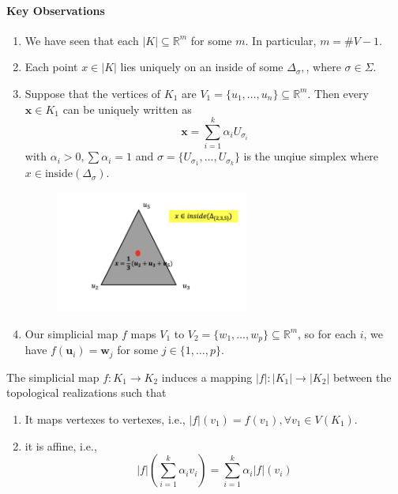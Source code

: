 \paragraph{Key Observations}
\begin{enumerate}
\item
We have seen that each $|K|\subseteq \mathbb{R}^m$ for some $m$.
In particular, $m=\# V-1$.
\item
Each point $x\in|K|$ lies uniquely on an inside of some $\Delta_\sigma,$, where $\sigma\in\Sigma$.
\item
Suppose that the vertices of $K_1$ are $V_1=\{u_1,\dots,u_n\}\subseteq\mathbb{R}^m$.
Then every $\bm x\in K_1$ can be uniquely written as
\[
\bm x=\sum_{i=1}^k\alpha_iU_{\sigma_i}
\]
with $\alpha_i>0,\sum\alpha_i=1$
and $\sigma=\{U_{\sigma_1},\dots,U_{\sigma_k}\}$ is the unqiue simplex where $x\in\text{inside}(\Delta_\sigma)$.

\begin{figure}[H]
\centering
\includegraphics[width=0.6\textwidth]{week9/p_6}
\end{figure}
\item
Our simplicial map $f$ maps $V_1$ to $V_2=\{ w_1,\dots, w_p\}\subseteq\mathbb{R}^m$, so for each $i$, we have $f(\bm u_i) = \bm w_j$ for some $j\in\{1,\dots,p\}$.
\end{enumerate}

\begin{definition}
The simplicial map $f:K_1\to K_2$ induces a mapping $|f|:|K_1|\to|K_2|$ between the topological realizations such that
\begin{enumerate}
\item
It maps vertexes to vertexes, i.e., $|f|(v_1) = f(v_1),\forall v_1\in V(K_1)$.
\item
it is affine, i.e.,
\[
|f|\left(\sum_{i=1}^k\alpha_i v_i\right)
=
\sum_{i=1}^k\alpha_i|f|(v_i)
\]
\end{enumerate}
\end{definition}

